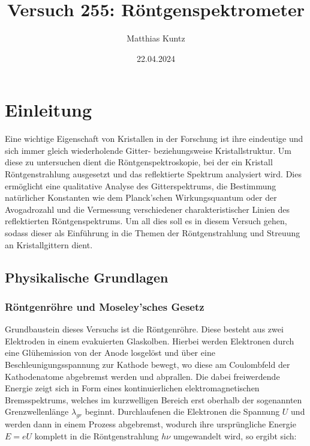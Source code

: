 \documentclass{article}
\title{Versuch 255: Röntgenspektrometer}
\author{Matthias Kuntz}
\date{22.04.2024}
\begin{document}
\maketitle

\tableofcontents

\newpage

\section{Einleitung}

Eine wichtige Eigenschaft von Kristallen in der Forschung ist ihre eindeutige und sich immer gleich wiederholende Gitter- beziehungsweise Kristallstruktur. Um diese zu untersuchen dient die Röntgenspektroskopie, bei der ein Kristall Röntgenstrahlung ausgesetzt und das reflektierte Spektrum analysiert wird. Dies ermöglicht eine qualitative Analyse des Gitterspektrums, die Bestimmung natürlicher Konstanten wie dem Planck'schen Wirkungsquantum oder der Avogadrozahl und die Vermessung verschiedener charakteristischer Linien des reflektierten Röntgenspektrums. Um all dies soll es in diesem Versuch gehen, sodass dieser als Einführung in die Themen der Röntgenstrahlung und Streuung an Kristallgittern dient.

\subsection{Physikalische Grundlagen}

\subsubsection{Röntgenröhre und Moseley'sches Gesetz}

Grundbaustein dieses Versuchs ist die Röntgenröhre. Diese besteht aus zwei Elektroden in einem evakuierten Glaskolben. Hierbei werden Elektronen durch eine Glühemission von der Anode losgelöst und über eine Beschleunigungsspannung zur Kathode bewegt, wo diese am Coulombfeld der Kathodenatome abgebremst werden und abprallen. Die dabei freiwerdende Energie zeigt sich in Form eines kontinuierlichen elektromagnetischen Bremsspektrums, welches im kurzwelligen Bereich erst oberhalb der sogenannten Grenzwellenlänge $\lambda_{gr}$ beginnt. Durchlaufenen die Elektronen die Spannung $U$ und werden dann in einem Prozess abgebremst, wodurch ihre ursprüngliche Energie $E = e U$ komplett in die Röntgenstrahlung $h \nu$ umgewandelt wird, so ergibt sich:
\end{document}
